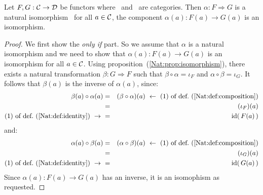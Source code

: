 \begin{prop}\label{Nat:prop:isomorphism:component}
    Let $F,G:\mbox{$\cal C$}\to\mbox{$\cal D$}$ be functors where \Cat\ and \Dat\ are categories.
    Then $\alpha:F\Rightarrow G$ is a natural isomorphism \ifand\ for
    all $a\in\mbox{$\cal C$}$, the component $\alpha(a):F(a)\to G(a)$ is an isomorphism.
\end{prop}
\begin{proof}
    We first show the {\em only if} part. So we assume that $\alpha$
    is a natural isomorphism and we need to show that $\alpha(a):F(a)\to G(a)$ 
    is an isomorphism for all $a\in\mbox{$\cal C$}$. Using
    proposition~(\ref{Nat:prop:isomorphism}), there exists a natural
    transformation $\beta:G\Rightarrow F$ such that
    $\beta\circ\alpha=\iota_{F}$ and $\alpha\circ\beta=\iota_{G}$.
    It follows that $\beta(a)$ is the inverse of $\alpha(a)$, since:
        \begin{eqnarray*}\beta(a)\circ\alpha(a)
            &=&(\beta\circ\alpha)(a)\ \leftarrow\ 
            \mbox{$(1)$ of def.~(\ref{Nat:def:composition})}\\
            &=&(\iota_{F})(a)\\
            \mbox{$(1)$ of def.~(\ref{Nat:def:identity})}\ \to\ 
            &=&\id(\,F(a)\,)
        \end{eqnarray*}
    and:
        \begin{eqnarray*}\alpha(a)\circ\beta(a)
            &=&(\alpha\circ\beta)(a)\ \leftarrow\ 
            \mbox{$(1)$ of def.~(\ref{Nat:def:composition})}\\
            &=&(\iota_{G})(a)\\
            \mbox{$(1)$ of def.~(\ref{Nat:def:identity})}\ \to\ 
            &=&\id(\,G(a)\,)
        \end{eqnarray*}
    Since $\alpha(a):F(a)\to G(a)$ has an inverse, it is an isomophism
    as requested.


\end{proof}
